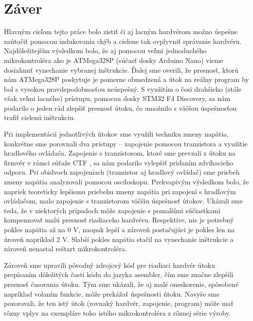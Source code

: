 \chapter*{Záver}  %

Hlavným cieľom tejto práce bolo zistiť či aj lacným hardvérom možno úspešne zaútočiť pomocou indukovania chýb a cielene tak ovplyvniť správanie hardvéru. Najdôležitejším výsledkom bolo, že aj pomocou veľmi jednoduchého mikrokontroléra ako je ATMega328P (súčasť dosky Arduino Nano) vieme dosiahnuť vynechanie vybranej inštrukcie. Ďalej sme overili, že presnosť, ktorú nám ATMega328P poskytuje je pomerne obmedzená a útok na reálny program by bol s vysokou pravdepodobnosťou neúspešný. S využitím o čosi drahšieho (stále však veľmi lacného) prístupu, pomocou dosky STM32 F4 Discovery, sa nám podarilo o jeden rád zlepšiť presnosť útoku, čo umožnilo s väčšou úspešnosťou trafiť cielenú inštrukciu.

Pri implementácii jednotlivých útokov sme využili techniku zmeny napätia, konkrétne sme porovnali dva prístupy -- zapojenie pomocou tranzistora a využitie hradlového ovládača. Zapojenie s tranzistorom, ktoré sme prevzali z útoku na firmvér v rámci súťaže CTF \cite{vccOnTheCheap}, sa nám podarilo vylepšiť pridaním zdvíhacieho odporu. Pri obidvoch zapojeniach (tranzistor aj hradlový ovládač) sme priebeh zmeny napätia analyzovali pomocou osciloskopu. Prekvapivým výsledkom bolo, že napriek teoreticky lepšiemu priebehu zmeny napätia pri zapojení s hradlovým ovládačom, malo zapojenie s tranzistorom väčšiu úspešnosť útokov. Ukázali sme teda, že v niektorých prípadoch môže zapojenie s pomalšími súčiastkami kompenzovať malú presnosť riadiaceho hardvéru. Respektíve, nie je potrebný pokles napätia až na 0 V, naopak lepší a zároveň postačujúci je pokles len na úroveň napríklad 2 V. Slabší pokles napätia stačil na vynechanie inštrukcie a zároveň nenastal reštart mikrokontroléra.

Zároveň sme upravili pôvodný zdrojový kód pre riadiaci hardvér útoku \cite{vccOnTheCheap} prepísaním dôležitých častí kódu do jazyka asembler, čím sme značne zlepšili presnosť časovania útoku. Tým sme ukázali, že aj malé oneskorenie, spôsobené napríklad volaním funkcie, môže prekážať úspešnosti útoku. Navyše sme pozorovali, že ten istý útok (rovnaký hardvér, zapojenie, program) môže mať rôzny vplyv na exempláre toho istého mikrokontroléra z rôznej série výroby.

